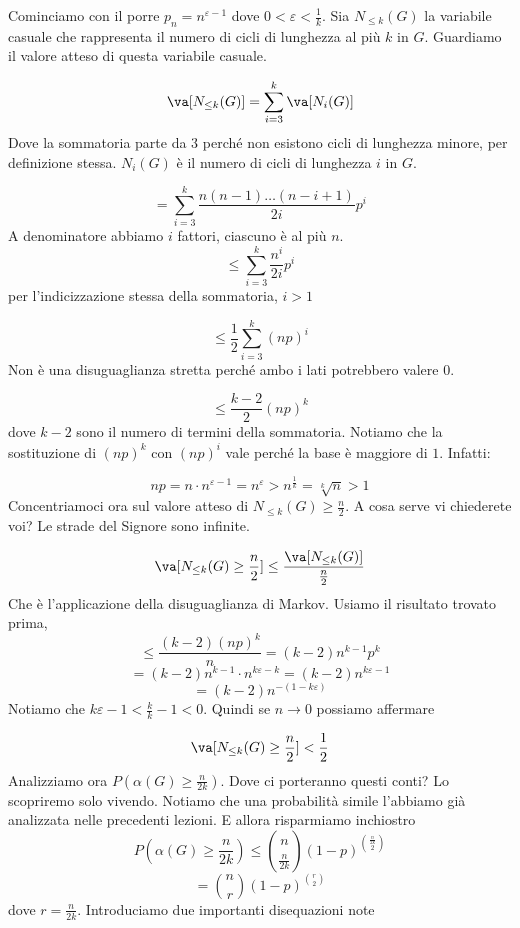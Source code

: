 \documentclass[12pt]{report}
\begin{document}
\begin{dimo}
    Cominciamo con il porre $p_n = n^{\varepsilon - 1}$ dove $0 < \varepsilon < \frac{1}{k}$. Sia $N_{\leq k}(G)$ la variabile casuale che rappresenta il numero di cicli di lunghezza al più $k$ in $G$. Guardiamo il valore atteso di questa variabile casuale.
    
    $$\va[N_{\leq k} (G)] = \sum_{i = 3}^{k} \va[N_i(G)]$$
    Dove la sommatoria parte da $3$ perché non esistono cicli di lunghezza minore, per definizione stessa. $N_i(G)$ è il numero di cicli di lunghezza $i$ in $G$.

    $$= \sum_{i = 3}^k \frac{n(n-1)\dots(n-i + 1)}{2i} p^i$$
    A denominatore abbiamo $i$ fattori, ciascuno è al più $n$.
    $$\leq \sum_{i = 3}^k \frac{n^i}{2i} p^i$$
    per l'indicizzazione stessa della sommatoria, $i > 1$

    $$\leq \frac{1}{2} \sum_{i=3}^k (np)^i$$
    Non è una disuguaglianza stretta perché ambo i lati potrebbero valere $0$.

    $$\leq \frac{k-2}{2} (np)^k$$
    dove $k-2$ sono il numero di termini della sommatoria.  Notiamo che la sostituzione di $(np)^k$ con $(np)^i$ vale perché la base è maggiore di $1$. Infatti:

    $$np = n \cdot n^{\varepsilon - 1} = n^{\varepsilon} > n^{\frac{1}{k}} = \sqrt[k]{n} > 1$$
    Concentriamoci ora sul valore atteso di $N_{\leq k} (G) \geq \frac{n}{2}$. A cosa serve vi chiederete voi? Le strade del Signore sono infinite.

    $$\va[N_{\leq k} (G) \geq \frac{n}{2}] \leq \frac{\va[N_{\leq k}(G)]}{\frac{n}{2}}$$
    Che è l'applicazione della disuguaglianza di Markov. Usiamo il risultato trovato prima,
    $$\leq \frac{(k-2)(np)^k}{n} = (k-2) n^{k-1}p^k $$
    $$= (k-2)n^{k-1} \cdot n^{k\varepsilon - k} = (k-2) n^{k \varepsilon - 1}$$
    $$= (k-2) n^{-(1-k\varepsilon)} $$
    Notiamo che $k\varepsilon - 1 < \frac{k}{k} - 1 < 0$. Quindi se $n \rightarrow 0$ possiamo affermare

    $$\va[N_{\leq k} (G) \geq \frac{n}{2}]  < \frac{1}{2}$$
    Analizziamo ora $P(\alpha(G) \geq \frac{n}{2k})$.
    Dove ci porteranno questi conti? Lo scopriremo solo vivendo. Notiamo che una probabilità simile l'abbiamo già analizzata nelle precedenti lezioni. E allora risparmiamo inchiostro 
    $$P(\alpha(G) \geq \frac{n}{2k}) \leq \binom{n}{\frac{n}{2k}} (1-p)^{\binom{\frac{n}{2k}}{2}}$$
    $$= \binom{n}{r} (1-p)^{\binom{r}{2}}$$
    dove $r = \frac{n}{2k}$. Introduciamo due importanti disequazioni note


\end{dimo}
\end{document}
